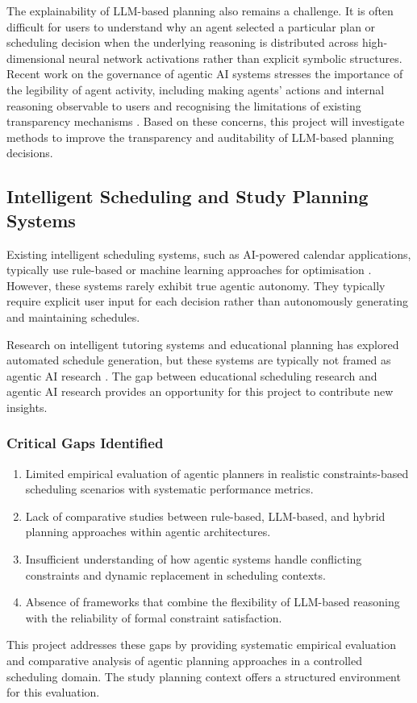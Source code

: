 \documentclass[12pt]{article}
\begin{document}
The explainability of LLM-based planning also remains a challenge. It is often difficult for users to understand why an agent selected a particular plan or scheduling decision when the underlying reasoning is distributed across high-dimensional neural network activations rather than explicit symbolic structures. Recent work on the governance of agentic AI systems stresses the importance of the legibility of agent activity, including making agents’ actions and internal reasoning observable to users and recognising the limitations of existing transparency mechanisms \parencite{shavit2023practices}. Based on these concerns, this project will investigate methods to improve the transparency and auditability of LLM-based planning decisions.

\subsection{Intelligent Scheduling and Study Planning Systems}

Existing intelligent scheduling systems, such as AI-powered calendar applications, typically use rule-based or machine learning approaches for optimisation \parencite{chen2023survey}. However, these systems rarely exhibit true agentic autonomy. They typically require explicit user input for each decision rather than autonomously generating and maintaining schedules.

Research on intelligent tutoring systems and educational planning has explored automated schedule generation, but these systems are typically not framed as agentic AI research \parencite{koedinger2010data}. The gap between educational scheduling research and agentic AI research provides an opportunity for this project to contribute new insights.
\subsubsection{Critical Gaps Identified}
\begin{enumerate}
    \item Limited empirical evaluation of agentic planners in realistic constraints-based scheduling scenarios with systematic performance metrics.
    \item Lack of comparative studies between rule-based, LLM-based, and hybrid planning approaches within agentic architectures.
    \item Insufficient understanding of how agentic systems handle conflicting constraints and dynamic replacement in scheduling contexts.
    \item Absence of frameworks that combine the flexibility of LLM-based reasoning with the reliability of formal constraint satisfaction.
\end{enumerate}
This project addresses these gaps by providing systematic empirical evaluation and comparative analysis of agentic planning approaches in a controlled scheduling domain. The study planning context offers a structured environment for this evaluation.
\end{document}
